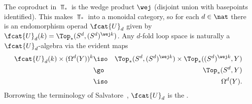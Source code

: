 \begin{example}	
The coproduct in $\Top_*$ is the wedge product $\wej$%
% 
% 
(disjoint union with basepoints identified).  This makes $\Top_*$ into a
monoidal category, so for each $d\in\nat$ there is an endomorphism operad
$\fcat{U}_d$ given by $\fcat{U}_d(k) = \Top_*(S^d, (S^d)^{\wej k})$.  Any
$d$-fold loop space is naturally a $\fcat{U}_d$-algebra via the evident
maps
%
\begin{eqnarray*}
\fcat{U}_d(k) \times (\Omega^d(Y))^k	&
\iso	&
\Top_*(S^d, (S^d)^{\wej k}) \times \Top_*((S^d)^{\wej k}, Y)	\\
&\go	& 
\Top_*(S^d, Y)	\\
&\iso	& 
\Omega^d(Y).
\end{eqnarray*}
%
Borrowing the terminology of Salvatore~\cite{Sal},%
%
%
$\fcat{U}_d$ is the
.  
\end{example}

